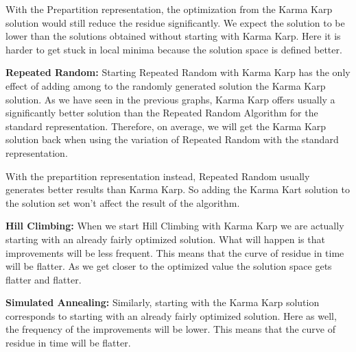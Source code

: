 \documentclass[11pt]{article}
\begin{document}
With the Prepartition representation, the optimization from the Karma Karp solution would still reduce the residue significantly. We expect the solution to be lower than the solutions obtained without starting with Karma Karp. Here it is harder to get stuck in local minima because the solution space is defined better. 



\textbf{Repeated Random:}
Starting Repeated Random with Karma Karp has the only effect of adding among to the randomly generated solution the Karma Karp solution. As we have seen in the previous graphs, Karma Karp offers usually a significantly better solution than the Repeated Random Algorithm for the standard representation. Therefore, on average, we will get the Karma Karp solution back when using the variation of Repeated Random with the standard representation.

With the prepartition representation instead, Repeated Random usually generates better results than Karma Karp. So adding the Karma Kart solution to the solution set won't affect the result of the algorithm.



\textbf{Hill Climbing:}
When we start Hill Climbing with Karma Karp we are actually starting with an already fairly optimized solution. What will happen is that improvements will be less frequent. This means that the curve of residue in time will be flatter. As we get closer to the optimized value the solution space gets flatter and flatter. 


%



\textbf{Simulated Annealing:}
Similarly, starting with the Karma Karp solution corresponds to starting with an already fairly optimized solution. Here as well, the frequency of the improvements will be lower. This means that the curve of residue in time will be flatter. 
\end{document}
